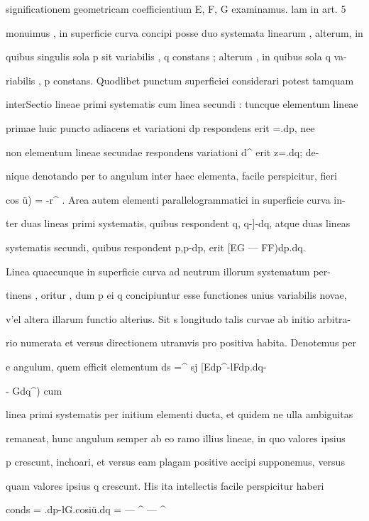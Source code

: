\documentclass[12pt,a4paper]{article}
\begin{document}
{{{significationem  geometricam  coefficientium  E,  F,  G  examinamus.  lam  in  art.  5

monuimus ,  in  superficie  curva  concipi  posse  duo  systemata  linearum ,  alterum,  in

quibus  singulis  sola  p  sit  variabilis ,  q  constans ;  alterum ,  in  quibus  sola  q  va-

riabilis ,  p  constans.  Quodlibet  punctum  superficiei  considerari  potest  tamquam

interSectio  lineae  primi  systematis  cum  linea  secundi :  tuncque  elementum  lineae

primae  huic  puncto  adiacens  et  variationi  dp  respondens  erit  =\jE.dp,  nee

non  elementum  lineae  secundae  respondens  variationi  d^  erit  z=\jG.dq;  de-

nique  denotando  per  to  angulum  inter  haec  elementa,  facile  perspicitur,  fieri

cos  ü)  =  -r^ .  Area  autem  elementi  parallelogrammatici  in  superficie  curva  in-

ter  duas  lineas  primi  systematis,  quibus  respondent  q,  q-]-dq,  atque  duas  lineas

systematis  secundi,  quibus  respondent  p,p-\-dp,    erit   \][EG  —  FF)dp.dq.

Linea  quaecunque  in  superficie  curva  ad  neutrum  illorum  systematum  per-

tinens ,  oritur ,  dum  p  ei  q  concipiuntur  esse  functiones  unius  variabilis  novae,

v'el  altera  illarum  functio  alterius.  Sit  s  longitudo  talis  curvae  ab  initio  arbitra-

rio  numerata  et  versus  directionem  utramvis  pro  positiva  habita.  Denotemus  per

e  angulum,  quem  efficit  elementum  ds  =^  sj [Edp^-\-lFdp.dq-{- Gdq^)  cum

linea  primi  systematis  per  initium  elementi  ducta,  et  quidem  ne  ulla  ambiguitas

remaneat,  hunc  angulum  semper  ab  eo  ramo  illius  lineae,  in  quo  valores  ipsius

p  crescunt,  inchoari,  et  versus  eam  plagam  positive  accipi  supponemus,  versus

quam  valores  ipsius  q  crescunt.     His  ita  intellectis  facile  perspicitur  haberi

co^^.ds  =  \lE.dp-\-\l  G.cosiü.dq  =  — ^ — ^

}}}}
\end{document}
